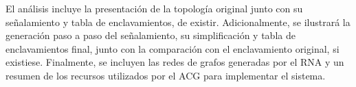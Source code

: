 	El análisis incluye la presentación de la topología original junto con su señalamiento y tabla de enclavamientos, de existir. Adicionalmente, se ilustrará la generación paso a paso del señalamiento, su simplificación y tabla de enclavamientos final, junto con la comparación con el enclavamiento original, si existiese. Finalmente, se incluyen las redes de grafos generadas por el RNA y un resumen de los recursos utilizados por el ACG para implementar el sistema.









